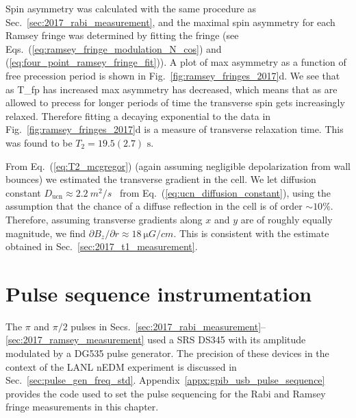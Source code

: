 Spin asymmetry was calculated with the same procedure as Sec.~\ref{sec:2017_rabi_measurement}, and the maximal spin asymmetry for each Ramsey fringe was determined by fitting the fringe (see Eqs.~(\ref{eq:ramsey_fringe_modulation_N_cos}) and (\ref{eq:four_point_ramsey_fringe_fit})). A plot of max asymmetry as a function of free precession period is shown in Fig.~\ref{fig:ramsey_fringes_2017}d. We see that as \gls*{T_fp} has increased max asymmetry has decreased, which means that as \ucn are allowed to precess for longer periods of time the transverse spin gets increasingly relaxed. Therefore fitting a decaying exponential to the data in Fig.~\ref{fig:ramsey_fringes_2017}d is a measure of transverse relaxation time. This was found to be $T_2=19.5(2.7)\text{ s}$.

From Eq.~(\ref{eq:T2_mcgregor}) (again assuming negligible depolarization from wall bounces) we estimated the transverse gradient in the cell. We let diffusion constant $D_\text{ucn}\approx \qty{2.2}{m^2 \per s}$~\cite{golubUCN} from Eq.~(\ref{eq:ucn_diffusion_constant}), using the assumption that the chance of a diffuse reflection in the cell is of order $\sim 10\%$. Therefore, assuming transverse gradients along $x$ and $y$ are of roughly equally magnitude, we find $\partial B_z/\partial r \approx \qty{18}{\micro G \per cm}$. This is consistent with the estimate obtained in Sec.~\ref{sec:2017_t1_measurement}.


\section{Pulse sequence instrumentation}


The $\pi$ and $\pi/2$ pulses in Secs.~\ref{sec:2017_rabi_measurement}--\ref{sec:2017_ramsey_measurement} used a SRS DS345 with its amplitude modulated by a DG535 pulse generator. The precision of these devices in the context of the LANL nEDM experiment is discussed in Sec.~\ref{sec:pulse_gen_freq_std}. Appendix~\ref{appx:gpib_usb_pulse_sequence} provides the code used to set the pulse sequencing for the Rabi and Ramsey fringe measurements in this chapter.

\vspace{\baselineskip}

